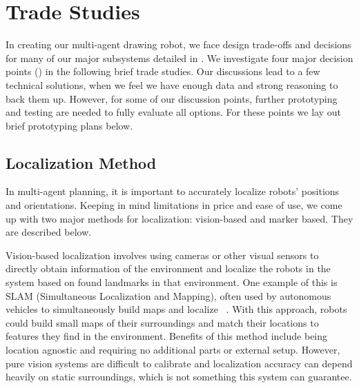 
\section{Trade Studies}
\label{sec:trade_studies}


In creating our multi-agent drawing robot, we face design trade-offs and decisions for many of our major subsystems detailed in . We investigate four major decision points () in the following brief trade studies. Our discussions lead to a few technical solutions, when we feel we have enough data and strong reasoning to back them up. However, for some of our discussion points, further prototyping and testing are needed to fully evaluate all options. For these points we lay out brief prototyping plans below. 

\subsection{Localization Method}
\label{sec:trade_localization}
In multi-agent planning, it is important to accurately localize robots' positions and orientations. Keeping in mind limitations in price and ease of use, we come up with two major methods for localization: vision-based and marker based. They are described below.

Vision-based localization involves using cameras or other visual sensors to directly obtain information of the environment and localize the robots in the system based on found landmarks in that environment. One example of this is SLAM (Simultaneous Localization and Mapping), often used by autonomous vehicles to simultaneously build maps and localize ~\cite{dissanayake2001solution}. With this approach, robots could build small maps of their surroundings and match their locations to features they find in the environment. Benefits of this method include being location agnostic and requiring no additional parts or external setup. However, pure vision systems are difficult to calibrate and localization accuracy can depend heavily on static surroundings, which is not something this system can guarantee.

